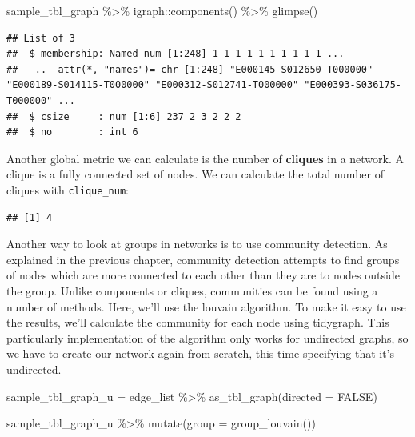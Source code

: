 \documentclass[
]{book}
\newenvironment{Shaded}{\begin{snugshade}}{\end{snugshade}}
\newcommand{\AttributeTok}[1]{\textcolor[rgb]{0.77,0.63,0.00}{#1}}
\newcommand{\ConstantTok}[1]{\textcolor[rgb]{0.00,0.00,0.00}{#1}}
\newcommand{\FunctionTok}[1]{\textcolor[rgb]{0.00,0.00,0.00}{#1}}
\newcommand{\NormalTok}[1]{#1}
\newcommand{\OtherTok}[1]{\textcolor[rgb]{0.56,0.35,0.01}{#1}}
\newcommand{\SpecialCharTok}[1]{\textcolor[rgb]{0.00,0.00,0.00}{#1}}
\begin{document}
\begin{Shaded}
\begin{Highlighting}[]
\NormalTok{sample\_tbl\_graph }\SpecialCharTok{\%\textgreater{}\%}\NormalTok{ igraph}\SpecialCharTok{::}\FunctionTok{components}\NormalTok{() }\SpecialCharTok{\%\textgreater{}\%} \FunctionTok{glimpse}\NormalTok{()}
\end{Highlighting}
\end{Shaded}

\begin{verbatim}
## List of 3
##  $ membership: Named num [1:248] 1 1 1 1 1 1 1 1 1 1 ...
##   ..- attr(*, "names")= chr [1:248] "E000145-S012650-T000000" "E000189-S014115-T000000" "E000312-S012741-T000000" "E000393-S036175-T000000" ...
##  $ csize     : num [1:6] 237 2 3 2 2 2
##  $ no        : int 6
\end{verbatim}

Another global metric we can calculate is the number of \textbf{cliques} in a network. A clique is a fully connected set of nodes. We can calculate the total number of cliques with \texttt{clique\_num}:

\begin{verbatim}
## [1] 4
\end{verbatim}

Another way to look at groups in networks is to use community detection. As explained in the previous chapter, community detection attempts to find groups of nodes which are more connected to each other than they are to nodes outside the group. Unlike components or cliques, communities can be found using a number of methods. Here, we'll use the louvain algorithm. To make it easy to use the results, we'll calculate the community for each node using tidygraph. This particularly implementation of the algorithm only works for undirected graphs, so we have to create our network again from scratch, this time specifying that it's undirected.

\begin{Shaded}
\begin{Highlighting}[]
\NormalTok{sample\_tbl\_graph\_u }\OtherTok{=}\NormalTok{ edge\_list }\SpecialCharTok{\%\textgreater{}\%} 
  \FunctionTok{as\_tbl\_graph}\NormalTok{(}\AttributeTok{directed =} \ConstantTok{FALSE}\NormalTok{)}

\NormalTok{sample\_tbl\_graph\_u }\SpecialCharTok{\%\textgreater{}\%} 
  \FunctionTok{mutate}\NormalTok{(}\AttributeTok{group =} \FunctionTok{group\_louvain}\NormalTok{())}
\end{Highlighting}
\end{Shaded}
\end{document}
